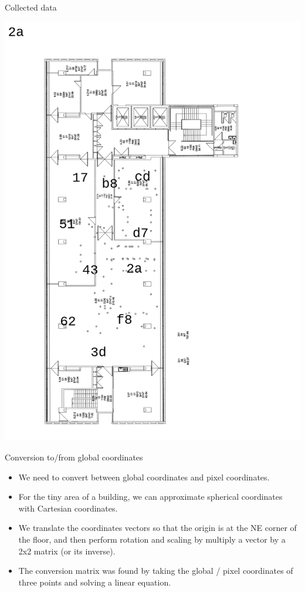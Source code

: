 \documentclass[landscape]{infslides}
\begin{document}
\begin{slide}{Collected data}
\begin{multicols}{2}
    \includegraphics[width=0.9\linewidth]{2a_read.png}
    \end{multicols}
\end{slide}

\begin{slide}{Conversion to/from global coordinates}
\begin{itemize}
\item We need to convert between global coordinates and pixel coordinates.
\item For the tiny area of a building, we can approximate spherical coordinates with Cartesian coordinates.
\item We translate the coordinates vectors so that the origin is at the NE corner of the floor, and then perform rotation and scaling by multiply a vector by a 2x2 matrix (or its inverse).
\item The conversion matrix was found by taking the global / pixel coordinates of three points and solving a linear equation.
\end{itemize}
\end{slide}
\end{document}
